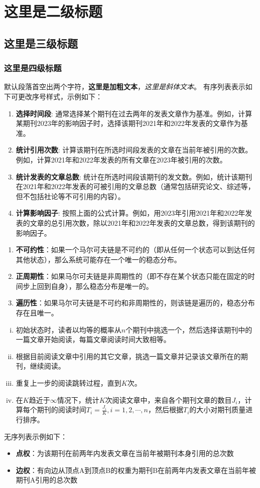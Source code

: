 \section{这里是二级标题}
\subsection{这里是三级标题}
\subsubsection{这里是四级标题}
默认段落首空出两个字符，\textbf{这里是加粗文本}，\textit{这里是斜体文本}。
有序列表表示如下可更改序号样式，示例如下：
\begin{enumerate}[(1)]
    \item \textbf{选择时间段}: 通常选择某个期刊在过去两年的发表文章作为基准。例如，计算某期刊2023年的影响因子时，选择该期刊2021年和2022年发表的文章作为基准。
    \item \textbf{统计引用次数}: 计算该期刊在所选时间段发表的文章在当前年被引用的次数。例如，计算2021年和2022年发表的所有文章在2023年被引用的次数。
    \item \textbf{统计发表的文章总数}: 统计在所选时间段该期刊的发文数。例如，统计该期刊在2021年和2022年发表的可被引用的文章总数（通常包括研究论文、综述等，但不包括社论等不可引用的内容）。
    \item \textbf{计算影响因子}: 按照上面的公式计算。例如，用2023年引用2021年和2022年发表的文章的总引用次数，除以2021年和2022年发表的文章总数，得到该期刊的影响因子。
\end{enumerate}
\begin{enumerate}
    \item \textbf{不可约性}：如果一个马尔可夫链是不可约的（即从任何一个状态可以到达任何其他状态），那么系统可能存在一个唯一的稳态分布。
    \item \textbf{正周期性}：如果马尔可夫链是非周期性的（即不存在某个状态只能在固定的时间步上回到自身），那么稳态分布是唯一的。
    \item  \textbf{遍历性}：如果马尔可夫链是不可约和非周期性的，则该链是遍历的，稳态分布存在且唯一。
\end{enumerate}
\begin{enumerate}[i)]
    \item 初始状态时，读者以均等的概率从$n$个期刊中挑选一个，然后选择该期刊中的一篇文章开始阅读，每篇文章阅读时间大致相等。
    \item 根据目前阅读文章中引用的其它文章，挑选一篇文章并记录该文章所在的期刊，继续阅读。
    \item 重复上一步的阅读跳转过程，直到$K$次。
    \item 在$K$趋近于$\infty$情况下，统计$K$次阅读文章中，来自各个期刊文章的数目$J_i$，计算每个期刊的阅读时间$T_i=\frac{J_i}{K}, i=1,2,\cdots,n$，然后根据$T_i$的大小对期刊质量进行排序。
\end{enumerate}
无序列表示例如下：
\begin{itemize}
    \item \textbf{点权}：为该期刊在前两年内发表文章在当前年被期刊本身引用的总次数
    \item \textbf{边权}：有向边从顶点A到顶点B的权重为期刊B在前两年内发表文章在当前年被期刊A引用的总次数
\end{itemize}